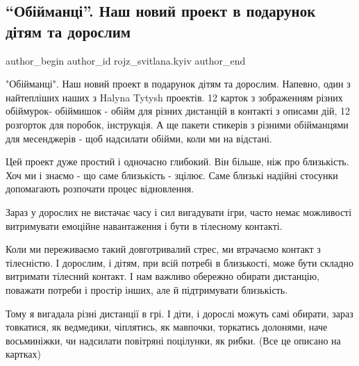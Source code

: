 





\subsection{\enquote{Обійманці}. Наш новий проект в подарунок дітям та дорослим}
\label{sec:19_12_2022.fb.rojz_svitlana.kyiv.1.obijmanci}

\ifcmt
 author_begin
   author_id rojz_svitlana.kyiv
 author_end
\fi

"Обійманці". Наш новий проект в подарунок дітям та дорослим. Напевно, один з
найтепліших наших з Halyna Tytysh  проектів. 12 карток з зображенням різних
обіймурок- обіймишок - обійм для різних дистанцій в контакті з описами дій, 12
розгорток для поробок, інструкція. А ще пакети стикерів з різними обійманцями
для месенджерів - щоб надсилати обійми, коли ми на відстані.

Цей проект дуже простий і одночасно глибокий. Він більше, ніж про близькість.
Хоч ми і знаємо - що саме близькість - зцілює. Саме близькі надійні стосунки
допомагають розпочати процес відновлення.

Зараз у дорослих не вистачає часу і сил вигадувати ігри, часто немає можливості
витримувати емоційне навантаження і бути в тілесному контакті.

Коли ми переживаємо такий довготривалий стрес, ми втрачаємо контакт з
тілесністю. І дорослим, і дітям, при всій потребі в близькості, може бути
складно витримати тілесний контакт. І нам важливо обережно обирати дистанцію,
поважати потреби і простір інших,  але й підтримувати близькість.

Тому я вигадала різні дистанції в грі. І діти, і дорослі можуть самі обирати,
зараз товкатися, як ведмедики, чіплятись, як мавпочки, торкатись долонями, наче
восьминіжки, чи надсилати повітряні поцілунки, як рибки. (Все це описано на
картках)

